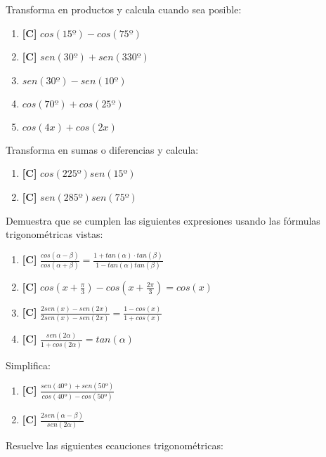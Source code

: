 \Exercicio Transforma en productos y calcula cuando sea posible:

\begin{enumerate}[topsep=0pt]
	\item \textbf{[C]} $cos(15º) - cos(75º)$
	\item \textbf{[C]} $sen(30º) + sen(330º)$
	
	\item $sen(30º) - sen(10º)$
	\item $cos(70º) + cos(25º)$
	\item $cos(4x) + cos(2x)$
\end{enumerate}


\Exercicio Transforma en sumas o diferencias y calcula:

\begin{enumerate}[topsep=0pt]
	\item \textbf{[C]} $cos(225º)sen(15º)$
	\item \textbf{[C]} $sen(285º)sen(75º)$
\end{enumerate}


\Exercicio Demuestra que se cumplen las siguientes expresiones usando las fórmulas trigonométricas vistas:

\begin{enumerate}[topsep=0pt]
	\item \textbf{[C]} $ \frac{cos(\alpha - \beta)}{cos(\alpha + \beta)} = \frac{1 + tan(\alpha) \cdot tan(\beta)}{1-tan(\alpha)tan(\beta)} $
	\item \textbf{[C]} $ cos(x + \frac{\pi}{3}) - cos(x + \frac{2\pi}{3}) = cos(x)$
	\item \textbf{[C]} $ \frac{2 sen(x) - sen(2x)}{2 sen(x) - sen(2x)} = \frac{1 - cos(x)}{1 + cos(x)}$
	\item \textbf{[C]} $ \frac{sen(2\alpha)}{1 + cos(2\alpha)} = tan(\alpha)$
\end{enumerate}


\Exercicio Simplifica:

\begin{enumerate}[topsep=0pt]
	\item \textbf{[C]} $\frac{sen(40º) + sen(50º)}{cos(40º) - cos(50º)}$
	\item \textbf{[C]} $\frac{2sen(\alpha - \beta)}{sen(2\alpha)}$
\end{enumerate}


\Exercicio Resuelve las siguientes ecauciones trigonométricas:

